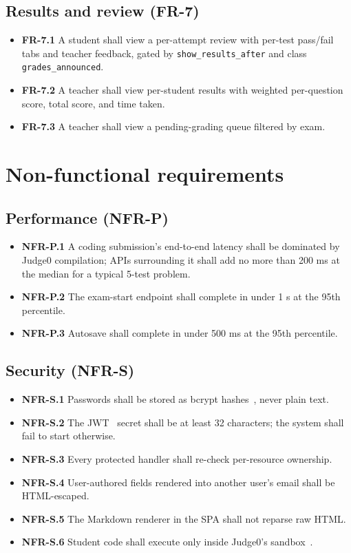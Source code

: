 \subsection{Results and review (FR-7)}

\begin{itemize}
  \item \textbf{FR-7.1} A student shall view a per-attempt review with per-test pass/fail tabs and teacher feedback, gated by \texttt{show\_results\_after} and class \texttt{grades\_announced}.
  \item \textbf{FR-7.2} A teacher shall view per-student results with weighted per-question score, total score, and time taken.
  \item \textbf{FR-7.3} A teacher shall view a pending-grading queue filtered by exam.
\end{itemize}

\section{Non-functional requirements}
\label{sec:nfr}

\subsection{Performance (NFR-P)}

\begin{itemize}
  \item \textbf{NFR-P.1} A coding submission's end-to-end latency shall be dominated by Judge0 compilation; APIs surrounding it shall add no more than 200 ms at the median for a typical 5-test problem.
  \item \textbf{NFR-P.2} The exam-start endpoint shall complete in under 1 s at the 95th percentile.
  \item \textbf{NFR-P.3} Autosave shall complete in under 500 ms at the 95th percentile.
\end{itemize}

\subsection{Security (NFR-S)}

\begin{itemize}
  \item \textbf{NFR-S.1} Passwords shall be stored as bcrypt hashes~\cite{provos1999bcrypt}, never plain text.
  \item \textbf{NFR-S.2} The JWT~\cite{rfc7519} secret shall be at least 32 characters; the system shall fail to start otherwise.
  \item \textbf{NFR-S.3} Every protected handler shall re-check per-resource ownership.
  \item \textbf{NFR-S.4} User-authored fields rendered into another user's email shall be HTML-escaped.
  \item \textbf{NFR-S.5} The Markdown renderer in the SPA shall not reparse raw HTML.
  \item \textbf{NFR-S.6} Student code shall execute only inside Judge0's sandbox~\cite{isolate}.
\end{itemize}

